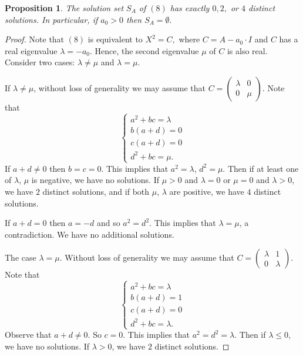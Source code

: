 \documentclass[12pt]{amsart}
\theoremstyle{plain}
\newtheorem{prop}[thm]{Proposition}
\theoremstyle{definition}
\begin{document}
\begin{prop}\label{lem_4} The solution set $S_A$ of $(8)$ has exactly $0, 2,$ or $4$  distinct solutions. In particular, if $a_0 > 0$ then $S_A = \emptyset.$
\end{prop}
\begin{proof}  Note that $(8)$ is equivalent to 
$X^2 = C,$
where $C = A - a_0 \cdot I$ and $C$ has a real eigenvalue $\lambda = -a_0$. Hence, the second eigenvalue
$\mu$ of $C$ is also  real. Consider two cases: $\lambda \ne \mu$ and $\lambda = \mu.$

If $\lambda \ne \mu$,
without loss of generality we may assume that 
$C = \left(\begin{array}{rr}  \lambda & 0 \\ 0 & \mu  \end{array}\right).$
Note that
$$
\left\{\begin{array}{l} a^2+bc= \lambda \\ b(a+d) = 0\\c(a+d) = 0 \\  d^2+bc= \mu.  \end{array}\right.
$$
If $a+d \ne 0$ then $b=c=0$. This implies that $a^2 = \lambda$, $d^2 = \mu$.  
Then if at least one of  $\lambda$, $\mu$ is negative, we have no solutions.
If $\mu > 0$ and $\lambda = 0$ or $\mu =0$ and $\lambda > 0$, we have $2$ distinct solutions, and if both  $\mu$,  $\lambda$ are positive, we have $4$ distinct solutions.

\noindent 
If $a+d = 0$ then $a= -d$ and so $a^2 = d^2$. This implies that $\lambda = \mu$, a contradiction.
We have no additional solutions. 

The case $\lambda = \mu$. Without loss of generality we may assume that
$C = \left(\begin{array}{rr}  \lambda &  1 \\ 0 & \lambda  \end{array}\right)$.
Note that
$$
\left\{\begin{array}{l} a^2+bc= \lambda \\ b(a+d) = 1\\c(a+d) = 0 \\  d^2+bc= \lambda.  \end{array}\right.
$$
Observe that $a+d \ne 0$. So  $c=0$. This implies that $a^2 = d^2= \lambda$.  
Then if $\lambda \leq 0$, we have no solutions.
If $\lambda >0$, we have $2$ distinct solutions.

\end{proof}
\end{document}
